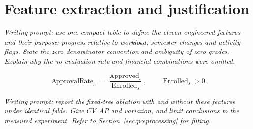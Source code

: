 \section{Feature extraction and justification}
\label{sec:feature-extraction}

\emph{Writing prompt: use one compact table to define the eleven engineered
features and their purpose: progress relative to workload, semester changes and
activity flags. State the zero-denominator convention and ambiguity of zero
grades. Explain why the no-evaluation rate and financial combinations were omitted.}

\begin{equation}
    \operatorname{ApprovalRate}_{s}
    = \frac{\operatorname{Approved}_{s}}{\operatorname{Enrolled}_{s}},
    \qquad \operatorname{Enrolled}_{s}>0.
    \label{eq:approval-rate}
\end{equation}

\emph{Writing prompt: report the fixed-tree ablation with and without these
features under identical folds. Give CV AP and variation, and limit conclusions
to the measured experiment. Refer to Section~\ref{sec:preprocessing} for fitting.}

